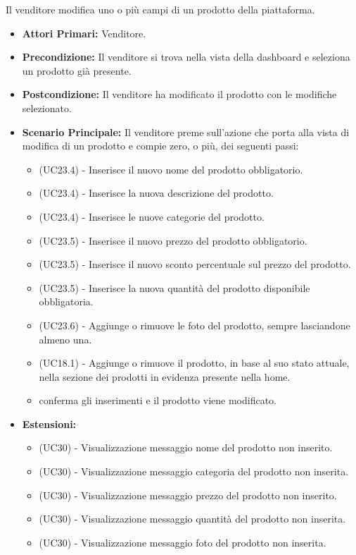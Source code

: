 Il venditore modifica uno o più campi di un prodotto della piattaforma.
\begin{itemize}
    \item \textbf{Attori Primari:} Venditore.
    \item \textbf{Precondizione:} Il venditore si trova nella vista della dashboard e seleziona un prodotto già presente.
    \item \textbf{Postcondizione:} Il venditore ha modificato il prodotto con le modifiche selezionato.
    \item \textbf{Scenario Principale:} Il venditore preme sull'azione che porta alla vista di modifica di un prodotto e compie zero, o più, dei seguenti passi:
    \begin{itemize}
        \item (UC23.4) - Inserisce il nuovo nome del prodotto obbligatorio.
        \item (UC23.4) - Inserisce la nuova descrizione del prodotto.
        \item (UC23.4) - Inserisce le nuove categorie del prodotto.
        \item (UC23.5) - Inserisce il nuovo prezzo del prodotto obbligatorio.
        \item (UC23.5) - Inserisce il nuovo sconto percentuale sul prezzo del prodotto.
        \item (UC23.5) - Inserisce la nuova quantità del prodotto disponibile obbligatoria.
        \item (UC23.6) - Aggiunge o rimuove le foto del prodotto, sempre lasciandone almeno una.
        \item (UC18.1) - Aggiunge o rimuove il prodotto, in base al suo stato attuale, nella sezione dei prodotti in evidenza presente nella home.
        \item conferma gli inserimenti e il prodotto viene modificato.
    \end{itemize}
    \item \textbf{Estensioni:}
    \begin{itemize}
        \item (UC30) - Visualizzazione messaggio nome del prodotto non inserito.
        \item (UC30) - Visualizzazione messaggio categoria del prodotto non inserita.
        \item (UC30) - Visualizzazione messaggio prezzo del prodotto non inserito.
        \item (UC30) - Visualizzazione messaggio quantità del prodotto non inserita.
        \item (UC30) - Visualizzazione messaggio foto del prodotto non inserita.
    \end{itemize}
\end{itemize}

